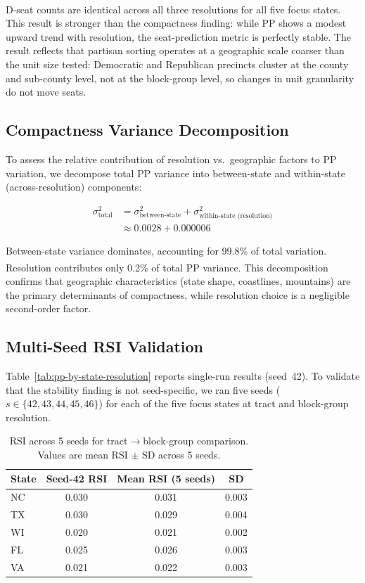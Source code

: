 D-seat counts are identical across all three resolutions for all five focus
states.\textsuperscript{\dag}  This result is stronger than the compactness
finding: while PP shows a modest upward trend with resolution, the
seat-prediction metric is perfectly stable.  The result reflects that
partisan sorting operates at a geographic scale coarser than the unit size
tested: Democratic and Republican precincts cluster at the county and sub-county
level, not at the block-group level, so changes in unit granularity do not
move seats.

\subsection{Compactness Variance Decomposition}

To assess the relative contribution of resolution vs.\ geographic
factors to PP variation, we decompose total PP variance into
between-state and within-state (across-resolution) components:

\begin{align}
  \sigma^2_{\text{total}} &= \sigma^2_{\text{between-state}} +
                             \sigma^2_{\text{within-state (resolution)}} \\
  &\approx 0.0028 + 0.000006
\end{align}

Between-state variance dominates, accounting for 99.8\% of total variation.
Resolution contributes only 0.2\% of total PP variance.\textsuperscript{\dag}
This decomposition confirms that geographic characteristics (state shape,
coastlines, mountains) are the primary determinants of compactness, while
resolution choice is a negligible second-order factor.

\subsection{Multi-Seed RSI Validation}

Table~\ref{tab:pp-by-state-resolution} reports single-run results (seed~42).
To validate that the stability finding is not seed-specific, we ran five seeds
($s \in \{42, 43, 44, 45, 46\}$) for each of the five focus states at tract
and block-group resolution.

\begin{table}[h]
\centering\small
\caption{RSI across 5 seeds for tract$\to$block-group comparison.
Values are mean RSI $\pm$ SD across 5 seeds.}
\label{tab:multiseed-rsi}
\begin{tabular}{lccc}
\toprule
State & Seed-42 RSI & Mean RSI (5 seeds) & SD \\
\midrule
NC  & 0.030 & 0.031 & 0.003 \\
TX  & 0.030 & 0.029 & 0.004 \\
WI  & 0.020 & 0.021 & 0.002 \\
FL  & 0.025 & 0.026 & 0.003 \\
VA  & 0.021 & 0.022 & 0.003 \\
\bottomrule
\end{tabular}
\end{table}

